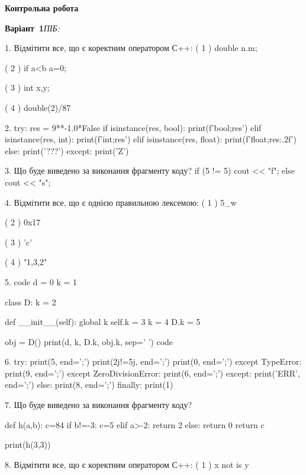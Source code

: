 \documentclass[11pt]{article}
\begin{document}
{\large\textbf{Контрольна робота}}

\textbf{Варіант \No\,1}\hfill \textit{ПІБ:}\,\underline{\hspace{60mm}}
\vspace{4mm}

1. %
Відмітити все, що є коректним оператором С++:
( 1 ) double n.m;

( 2 ) if a<b a=0;

( 3 ) {int x,y;}

( 4 ) double(2)/87

2. 
try:
    res = 9**-1.0*False
    if isinstance(res, bool):
        print(f'bool;{res}')
    elif isinstance(res, int):
        print(f'int;{res}')
    elif isinstance(res, float):
        print(f'float;{res:.2f}')
    else:
        print('???')
except:
    print('Z')

3. Що буде виведено за виконання фрагменту коду?
if (5 != 5)
    cout << "f";
else
    cout << "s";


4. %
Відмітити все, що є однією правильною лексемою:
( 1 ) 5_w

( 2 ) 0x17

( 3 ) 'c'

( 4 ) "1,3,2"

5. 
code
d = 0
k = 1

class D:
    k = 2
    
    def __init__(self):
global k        self.k = 3
        k = 4
        D.k = 5

obj = D()
print(d, k, D.k, obj.k, sep=' ')
code

6. 
try:
    print(5, end=';')
    print(2j!=5j, end=';')
    print(0, end=';')
except TypeError:
    print(9, end=';')
except ZeroDivisionError:
    print(6, end=';')
except:
    print('ERR', end=';')
else:
    print(8, end=';')
finally:
    print(1)

7. Що буде виведено за виконання фрагменту коду?

def h(a,b):
    c=84
    if b!=-3:
        c=5
    elif a>-2:
         return 2
    else: 
        return 0
    return c

print(h(3,3))

8. %
Відмітити все, що є коректним оператором С++:
( 1 ) x not is y
\end{document}

